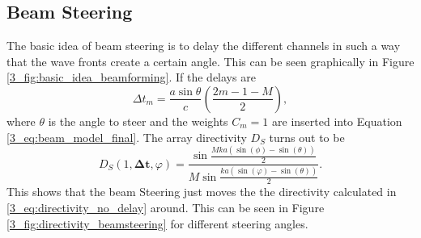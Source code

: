 \subsection{Beam Steering}
The basic idea of beam steering is to delay the different channels in such a way that the wave fronts create a certain angle. This can be seen graphically in Figure \ref{3_fig:basic_idea_beamforming}.
If the delays are
\begin{equation}
    \Delta t_m = \frac{a \sin{\theta}}{c} \left ( \frac{2m - 1 - M}{2}\right ),
\end{equation}
where $\theta$ is the angle to steer and the weights $C_m = 1$ are inserted into Equation \ref{3_eq:beam_model_final}.
The array directivity $D_S$ turns out to be \cite{alma99116706330905515}
\begin{equation}
    D_S(1, \bm{\Delta t} , \varphi) 
    = 
    \frac{\sin{\frac{Mka(\sin{(\phi)} - \sin{(\theta)})}{2}}}{M\sin{\frac{ka(\sin{(\varphi)} - \sin{(\theta)})}{2}}}.
\end{equation}
This shows that the beam Steering just moves the the directivity calculated in \ref{3_eq:directivity_no_delay} around.  
This can be seen in Figure \ref{3_fig:directivity_beamsteering} for different steering angles.  
